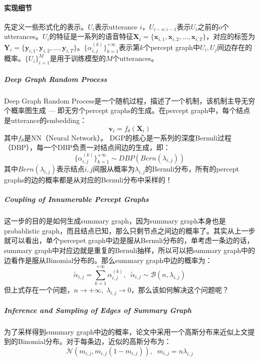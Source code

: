 \paragraph{实现细节}
先定义一些形式化的表示。$U_i$表示utterance $i$，$U_{i-o:i-1}$表示$U_i$之前的$o$个utterances。$U_i$的特征是一系列的语音特征$\boldsymbol{X}_i = \{\boldsymbol{x}_{i,1}, \boldsymbol{x}_{i,2}, ... ,\boldsymbol{x}_{i,T}\}$，对应的标签为$\boldsymbol{Y}_i = \{\boldsymbol{y}_{i,1}, \boldsymbol{y}_{i,2}, ... , \boldsymbol{y}_{i,T}\}$。$\{ \alpha_{i,j}^{(k)} \}_{k=1}^{+\infty}$表示第$k$个percept graph中$U_i, U_j$间边存在的概率。$\{U_i\}_{i=1}^{M}$是用于训练模型的$M$个utterances。
\subparagraph{Deep Graph Random Process}
Deep Graph Random Process是一个随机过程，描述了一个机制，该机制主导无穷个概率图生成 --- 即无穷个percept graphs的生成。在percept graph中，每个结点是utterance的embedding：
$$
\boldsymbol{v}_i = f_{\theta}(\boldsymbol{X}_i)
$$
其中$f_{\theta}$是NN（Neural Network）。
DGP的核心是一系列的深度Bernuli过程（DBP），每一个DBP负责一对结点间边的生成，即：
$$
\{ \alpha_{i,j}^{(k)} \}_{k=1}^{+\infty} \sim DBP(Bern(\lambda_{i,j}))
$$
其中$Bern(\lambda_{i,j})$表示结点$i,j$间服从概率为$\lambda_{i,j}$的Bernuli分布，所有的percept graphs的边的概率都是从对应的Bernuli分布中采样的！

\subparagraph{Coupling of Innumerable Percept Graphs}
这一步的目的是如何生成summary graph，因为summary graph本身也是probablistic graph，而且结点已知，那么只剩节点之间边的概率了。其实从上一步就可以看出，单个percepet graph中边是服从Bernuli分布的，单考虑一条边的话，summary graph中对应边就是重复的Bernuli抽样，所以可以把summary graph中的边看作是服从Binomial分布的。那么summary graph中边的概率为：
$$
\tilde{ \alpha}_{i,j} = \sum_{k=1}^{+\infty} \alpha_{i,j}^{(k)},\;\; \tilde{ \alpha}_{i,j} \sim \mathcal{B}(n, \lambda_{i,j})
$$
但上式存在一个问题，$n \rightarrow +\infty,\; \lambda_{i,j} \rightarrow 0$，那么该如何解决这个问题呢？

\subparagraph{Inference and Sampling of Edges of Summary Graph}
为了采样得到summary graph中边的概率，论文中采用一个高斯分布来近似上文提到的Binomial分布。对于每条边，近似的高斯分布为：
$$
\mathcal{N}(m_{i,j}, m_{i,j}(1-m_{i,j})),\;\; m_{i,j} = n\lambda_{i,j}
$$

